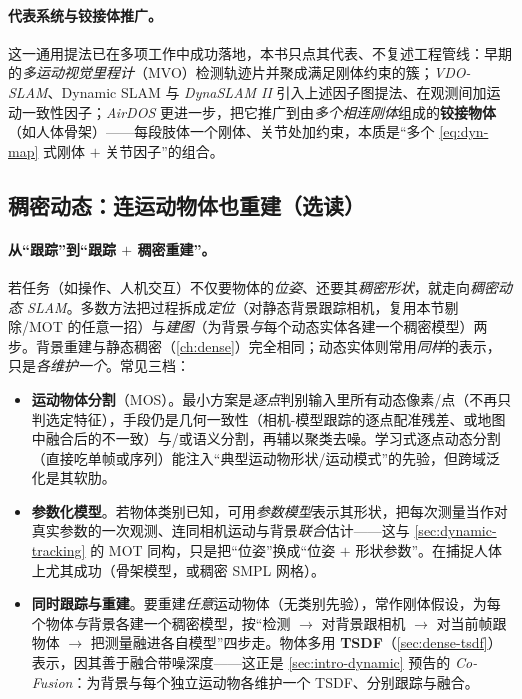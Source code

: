 \paragraph{代表系统与铰接体推广。}
这一通用提法已在多项工作中成功落地，本书只点其代表、不复述工程管线\cite{schmid2026dynamic}：早期的\emph{多运动视觉里程计}（MVO）检测轨迹片并聚成满足刚体约束的簇；\emph{VDO-SLAM}、Dynamic SLAM 与 \emph{DynaSLAM II}\cite{bescos2018dynaslam} 引入上述因子图提法、在观测间加运动一致性因子；\emph{AirDOS} 更进一步，把它推广到由\emph{多个相连刚体}组成的\textbf{铰接物体}（如人体骨架）——每段肢体一个刚体、关节处加约束，本质是“多个 \cref{eq:dyn-map} 式刚体 $+$ 关节因子”的组合。

\subsection{稠密动态：连运动物体也重建（选读）}
\label{sec:dynamic-dense}

\paragraph{从“跟踪”到“跟踪 $+$ 稠密重建”。}
若任务（如操作、人机交互）不仅要物体的\emph{位姿}、还要其\emph{稠密形状}，就走向\emph{稠密动态 SLAM}\cite{schmid2026dynamic}。多数方法把过程拆成\emph{定位}（对静态背景跟踪相机，复用本节剔除/MOT 的任意一招）与\emph{建图}（为背景\emph{与}每个动态实体各建一个稠密模型）两步。背景重建与静态稠密（\cref{ch:dense}）完全相同；动态实体则常用\emph{同样}的表示，只是\emph{各维护一个}。常见三档：

\begin{itemize}
  \item \textbf{运动物体分割}（MOS）。最小方案是\emph{逐点}判别输入里所有动态像素/点（不再只判选定特征），手段仍是几何一致性（相机-模型跟踪的逐点配准残差、或地图中融合后的不一致）与/或语义分割，再辅以聚类去噪。学习式逐点动态分割（直接吃单帧或序列）能注入“典型运动物形状/运动模式”的先验，但跨域泛化是其软肋。
  \item \textbf{参数化模型}。若物体类别已知，可用\emph{参数模型}表示其形状，把每次测量当作对真实参数的一次观测、连同相机运动与背景\emph{联合}估计——这与 \cref{sec:dynamic-tracking} 的 MOT 同构，只是把“位姿”换成“位姿 $+$ 形状参数”。在捕捉人体上尤其成功（骨架模型，或稠密 SMPL 网格）。
  \item \textbf{同时跟踪与重建}。要重建\emph{任意}运动物体（无类别先验），常作刚体假设，为每个物体\emph{与}背景各建一个稠密模型，按“检测 $\to$ 对背景跟相机 $\to$ 对当前帧跟物体 $\to$ 把测量融进各自模型”四步走。物体多用 \textbf{TSDF}（\cref{sec:dense-tsdf}）表示，因其善于融合带噪深度——这正是 \cref{sec:intro-dynamic} 预告的 \emph{Co-Fusion}\cite{runz2017cofusion}：为背景与每个独立运动物各维护一个 TSDF、分别跟踪与融合。
\end{itemize}

